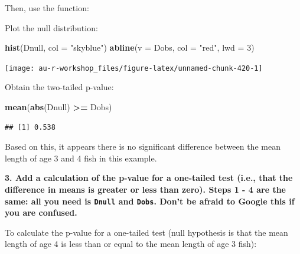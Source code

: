 \documentclass[]{book}
\newenvironment{Shaded}{\begin{snugshade}}{\end{snugshade}}
\newcommand{\DataTypeTok}[1]{\textcolor[rgb]{0.13,0.29,0.53}{#1}}
\newcommand{\DecValTok}[1]{\textcolor[rgb]{0.00,0.00,0.81}{#1}}
\newcommand{\KeywordTok}[1]{\textcolor[rgb]{0.13,0.29,0.53}{\textbf{#1}}}
\newcommand{\NormalTok}[1]{#1}
\newcommand{\OperatorTok}[1]{\textcolor[rgb]{0.81,0.36,0.00}{\textbf{#1}}}
\newcommand{\StringTok}[1]{\textcolor[rgb]{0.31,0.60,0.02}{#1}}
\begin{document}
Then, use the function:

\begin{Shaded}
\end{Shaded}

Plot the null distribution:

\begin{Shaded}
\begin{Highlighting}[]
\KeywordTok{hist}\NormalTok{(Dnull, }\DataTypeTok{col =} \StringTok{"skyblue"}\NormalTok{)}
\KeywordTok{abline}\NormalTok{(}\DataTypeTok{v =}\NormalTok{ Dobs, }\DataTypeTok{col =} \StringTok{"red"}\NormalTok{, }\DataTypeTok{lwd =} \DecValTok{3}\NormalTok{)}
\end{Highlighting}
\end{Shaded}

\begin{center}\texttt{[image: au-r-workshop\_files/figure-latex/unnamed-chunk-420-1]} \end{center}

Obtain the two-tailed p-value:

\begin{Shaded}
\begin{Highlighting}[]
\KeywordTok{mean}\NormalTok{(}\KeywordTok{abs}\NormalTok{(Dnull) }\OperatorTok{>=}\StringTok{ }\NormalTok{Dobs)}
\end{Highlighting}
\end{Shaded}

\begin{verbatim}
## [1] 0.538
\end{verbatim}

Based on this, it appears there is no significant difference between the mean length of age 3 and 4 fish in this example.

\textbf{3. Add a calculation of the p-value for a one-tailed test (i.e., that the difference in means is greater or less than zero). Steps 1 - 4 are the same: all you need is \texttt{Dnull} and \texttt{Dobs}. Don't be afraid to Google this if you are confused.}

To calculate the p-value for a one-tailed test (null hypothesis is that the mean length of age 4 is less than or equal to the mean length of age 3 fish):
\end{document}
